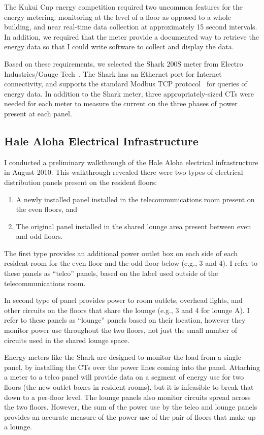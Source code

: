 The Kukui Cup energy competition required two uncommon features for the energy metering: monitoring at the level of a floor as opposed to a whole building, and near real-time data collection at approximately 15 second intervals. In addition, we required that the meter provide a documented way to retrieve the energy data so that I could write software to collect and display the data.

Based on these requirements, we selected the Shark 200S meter from Electro Industries/Gauge Tech~\cite{shark-200s}. The Shark has an Ethernet port for Internet connectivity, and supports the standard Modbus TCP protocol~\cite{modbus-website} for queries of energy data. In addition to the Shark meter, three appropriately-sized CTs were needed for each meter to measure the current on the three phases of power present at each panel.


\subsection{Hale Aloha Electrical Infrastructure}
\label{sec:electrical-infrastructure}

I conducted a preliminary walkthrough of the Hale Aloha electrical infrastructure in August 2010. This walkthrough revealed there were two types of electrical distribution panels present on the resident floors:

\begin{enumerate}
	\item A newly installed panel installed in the telecommunications room present on the even floors, and
  \item The original panel installed in the shared lounge area present between even and odd floors.
\end{enumerate}

The first type provides an additional power outlet box on each side of each resident room for the even floor and the odd floor below (e.g., 3 and 4). I refer to these panels as ``telco'' panels, based on the label used outside of the telecommunications room.

In second type of panel provides power to room outlets, overhead lights, and other circuits on the floors that share the lounge (e.g., 3 and 4 for lounge A). I refer to these panels as ``lounge'' panels based on their location, however they monitor power use throughout the two floors, not just the small number of circuits used in the shared lounge space.

Energy meters like the Shark are designed to monitor the load from a single panel, by installing the CTs over the power lines coming into the panel. Attaching a meter to a telco panel will provide data on a segment of energy use for two floors (the new outlet boxes in resident rooms), but it is infeasible to break that down to a per-floor level. The lounge panels also monitor circuits spread across the two floors. However, the sum of the power use by the telco and lounge panels provides an accurate measure of the power use of the pair of floors that make up a lounge.


